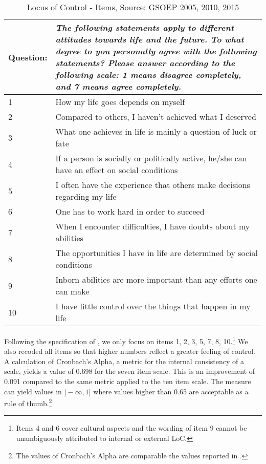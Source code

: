 \documentclass[12pt, a4paper, fleqn, parskip]{scrartcl}
\begin{document}
\begin{table}[H]
    \begin{tabular}{p{1.5cm} p{14cm}}
    \toprule
    Question: & \textit{The following statements apply to different attitudes towards
    life and the future. To what degree to you personally agree with the following
    statements? Please answer according to the following scale: 1 means disagree
    completely, and 7 means agree completely.} \\
    \midrule
    1  & How my life goes depends on myself \\
    2  & Compared to others, I haven't achieved what I deserved \\
    3  & What one achieves in life is mainly a question of luck or fate \\
    4  & If a person is socially or politically active, he/she can have an effect on social conditions \\
    5  & I often have the experience that others make decisions regarding my life \\
    6  & One has to work hard in order to succeed \\
    7  & When I encounter difficulties, I have doubts about my abilities \\
    8  & The opportunities I have in life are determined by social conditions \\
    9  & Inborn abilities are more important than any efforts one can make \\
    10 & I have little control over the things that happen in my life \\
    \bottomrule
    \end{tabular}
    \caption{Locus of Control - Items, Source: GSOEP 2005, 2010, 2015}
    \label{tab:loc_items}
\end{table}

Following the specification of \citet{specht2013}, we only focus on items 1, 2, 3, 5, 7,
8, 10.\footnote{Items 4 and 6 cover cultural aspects and the wording of item 9 cannot be
unambiguously attributed to internal or external LoC.} We also recoded all items so that
higher numbers reflect a greater feeling of control. A calculation of Cronbach's Alpha,
a metric for the internal consistency of a scale, yields a value of 0.698 for the seven
item scale. This is an improvement of 0.091 compared to the same metric applied to the
ten item scale. The measure can yield values in $]-\infty, 1]$ where values higher than
0.65 are acceptable as a rule of thumb.\footnote{The values of Cronbach's Alpha are
comparable the values reported in \citet{richter2017}.}
\end{document}
